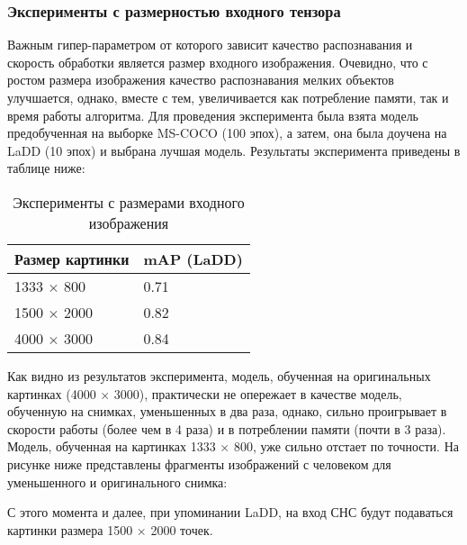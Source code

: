 \subsubsection{Эксперименты с размерностью входного тензора}

Важным гипер-параметром от которого зависит качество распознавания и скорость обработки является размер входного изображения. Очевидно, что с ростом размера изображения качество распознавания мелких объектов улучшается, однако, вместе с тем, увеличивается как потребление памяти, так и время работы алгоритма. Для проведения эксперимента была взята модель предобученная на выборке MS-COCO (100 эпох), а затем, она была доучена на LaDD (10 эпох) и выбрана лучшая модель. Результаты эксперимента приведены в таблице ниже:

\begin{table}[H]
    \caption{Эксперименты с размерами входного изображения}\label{image-size-table}
    \begin{tabular}{|p{7cm}|p{5cm}|}
        \hline
        {Размер картинки} & {mAP (LaDD)} \\
        \hline
        1333 $\times$ 800 & 0.71 \\
        \hline
        1500 $\times$ 2000 & 0.82 \\
        \hline
        4000 $\times$ 3000 & 0.84 \\
        \hline
    \end{tabular}
\end{table}

Как видно из результатов эксперимента, модель, обученная на оригинальных картинках (4000 $\times$ 3000), практически не опережает в качестве модель, обученную на снимках, уменьшенных в два раза, однако, сильно проигрывает в скорости работы (более чем в 4 раза) и в потреблении памяти (почти в 3 раза). Модель, обученная на картинках 1333 $\times$ 800, уже сильно отстает по точности. На рисунке ниже представлены фрагменты изображений с человеком для уменьшенного и оригинального снимка:


С этого момента и далее, при упоминании LaDD, на вход СНС будут подаваться картинки размера 1500 $\times$ 2000 точек.